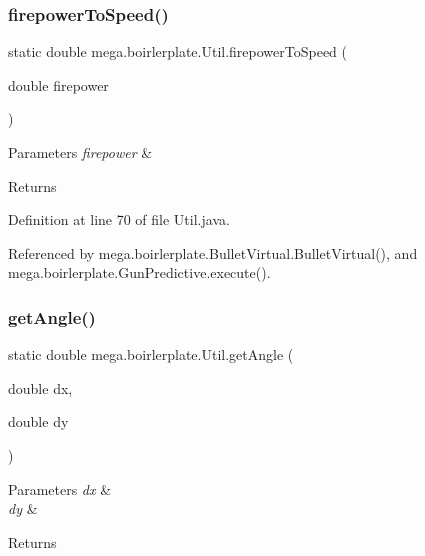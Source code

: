 \subsubsection{\texorpdfstring{firepower\+To\+Speed()}{firepowerToSpeed()}}
{\footnotesize\ttfamily static double mega.\+boirlerplate.\+Util.\+firepower\+To\+Speed (\begin{DoxyParamCaption}\item[{double}]{firepower }\end{DoxyParamCaption})\hspace{0.3cm}{\ttfamily [static]}}


\begin{DoxyParams}{Parameters}
{\em firepower} & \\
\hline
\end{DoxyParams}
\begin{DoxyReturn}{Returns}

\end{DoxyReturn}


Definition at line 70 of file Util.\+java.



Referenced by mega.\+boirlerplate.\+Bullet\+Virtual.\+Bullet\+Virtual(), and mega.\+boirlerplate.\+Gun\+Predictive.\+execute().

\mbox{\label{classmega_1_1boirlerplate_1_1_util_a2990805eef3f1de7aa2856009d714358}} 
\subsubsection{\texorpdfstring{get\+Angle()}{getAngle()}\hspace{0.1cm}{\footnotesize\ttfamily [1/2]}}
{\footnotesize\ttfamily static double mega.\+boirlerplate.\+Util.\+get\+Angle (\begin{DoxyParamCaption}\item[{double}]{dx,  }\item[{double}]{dy }\end{DoxyParamCaption})\hspace{0.3cm}{\ttfamily [static]}}


\begin{DoxyParams}{Parameters}
{\em dx} & \\
\hline
{\em dy} & \\
\hline
\end{DoxyParams}
\begin{DoxyReturn}{Returns}

\end{DoxyReturn}


